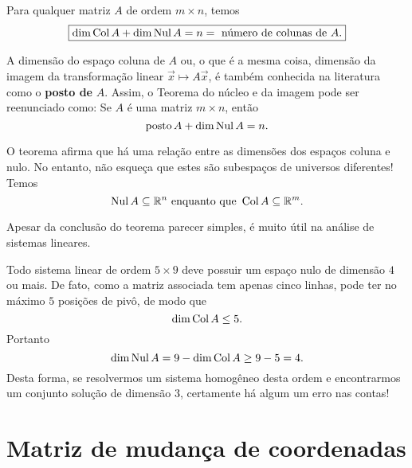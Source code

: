 \documentclass[../livro.tex]{subfiles}  %
\begin{document}
\begin{theorem}
	Para qualquer matriz $A$ de ordem $m\times n$, temos
	\[
	\boxed{\operatorname{dim} \operatorname{Col} A + \operatorname{dim} \operatorname{Nul} A = n = \text{ número de colunas de } A.}
	\]
\end{theorem}

\begin{remark}
	A dimensão do espaço coluna de $A$ ou, o que é a mesma coisa, dimensão da imagem da transformação linear $\vec{x} \mapsto A\vec{x}$, é também conhecida na literatura como o \textbf{posto de} $A$. Assim, o Teorema do núcleo e da imagem pode ser reenunciado como: Se $A$ é uma matriz $m\times n$, então
	\[
	\operatorname{posto} A + \operatorname{dim} \operatorname{Nul} A = n.
	\]
\end{remark}

\begin{remark}
	O teorema afirma que há uma relação entre as dimensões dos espaços coluna e nulo. No entanto, não esqueça que estes são subespaços de universos diferentes! Temos 
	\[
	\operatorname{Nul} A \subseteq \mathbb{R}^n \text{ enquanto que } \operatorname{Col} A \subseteq \mathbb{R}^m.
	\]
\end{remark}

Apesar da conclusão do teorema parecer simples, é muito útil na análise de sistemas lineares.

\begin{example}
	Todo sistema linear de ordem $5 \times 9$ deve possuir um espaço nulo de dimensão $4$ ou mais. De fato, como a matriz associada tem apenas cinco linhas, pode ter no máximo $5$ posições de pivô, de modo que
	\[
	\operatorname{dim} \operatorname{Col} A \le 5.
	\] Portanto
	\[
	\operatorname{dim} \operatorname{Nul} A = 9 - \operatorname{dim} \operatorname{Col} A \ge 9 - 5 = 4.
	\] Desta forma, se resolvermos um sistema homogêneo desta ordem e encontrarmos um conjunto solução de dimensão 3, certamente  há algum um erro nas contas!
\end{example}















\section{Matriz de mudança de coordenadas}
\end{document}
